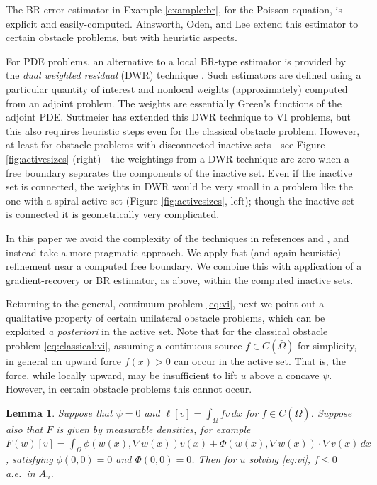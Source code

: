 \documentclass[]{interact}
\theoremstyle{plain}%
\newtheorem{lemma}[theorem]{Lemma}
\theoremstyle{definition}
\theoremstyle{remark}
\newcommand{\grad}{\nabla}
\begin{document}
The BR error estimator in Example \ref{example:br}, for the Poisson equation, is explicit and easily-computed.  Ainsworth, Oden, and Lee \cite{AinsworthOdenLee1993} extend this estimator to certain obstacle problems, but with heuristic aspects.

For PDE problems, an alternative to a local BR-type estimator is provided by the \emph{dual weighted residual} (DWR) technique \cite{BangerthRannacher2003}.  Such estimators are defined using a particular quantity of interest and nonlocal weights (approximately) computed from an adjoint problem.  The weights are essentially Green's functions of the adjoint PDE.  Suttmeier \cite{Suttmeier2008} has extended this DWR technique to VI problems, but this also requires heuristic steps even for the classical obstacle problem.  However, at least for obstacle problems with disconnected inactive sets---see Figure \ref{fig:activesizes} (right)---the weightings from a DWR technique are zero when a free boundary separates the components of the inactive set.  Even if the inactive set is connected, the weights in DWR would be very small in a problem like the one with a spiral active set (Figure \ref{fig:activesizes}, left); though the inactive set is connected it is geometrically very complicated.

In this paper we avoid the complexity of the techniques in references \cite{AinsworthOdenLee1993} and \cite{Suttmeier2008}, and instead take a more pragmatic approach.  We apply fast (and again heuristic) refinement near a computed free boundary.  We combine this with application of a gradient-recovery or BR estimator, as above, within the computed inactive sets.

Returning to the general, continuum problem \eqref{eq:vi}, next we point out a qualitative property of certain unilateral obstacle problems, which can be exploited \emph{a posteriori} in the active set.  Note that for the classical obstacle problem \eqref{eq:classical:vi}, assuming a continuous source $f\in C(\bar\Omega)$ for simplicity, in general an upward force $f(x)>0$ can occur in the active set.  That is, the force, while locally upward, may be insufficient to lift $u$ above a concave $\psi$.  However, in certain obstacle problems this cannot occur.

\begin{lemma} \label{lem:blister}
Suppose that $\psi=0$ and $\ell[v] = \int_\Omega fv\,dx$ for $f\in C(\bar\Omega)$.  Suppose also that $F$ is given by measurable densities, for example $F(w)[v]=\int_\Omega \phi(w(x),\grad w(x)) v(x) + \Phi(w(x),\grad w(x)) \cdot \grad v(x)\,dx$, satisfying $\phi(0,0)=0$ and $\Phi(0,0)=0$.  Then for $u$ solving \eqref{eq:vi}, $f\le 0$ a.e.~in $A_u$.
\end{lemma}
\end{document}
